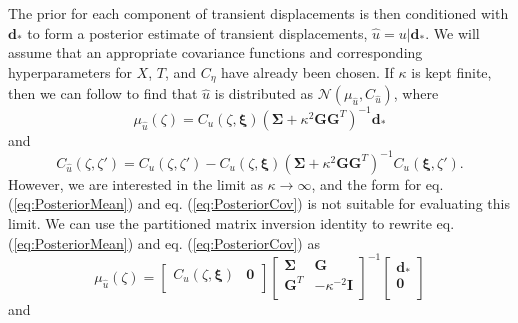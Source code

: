 \documentclass[10pt,letter]{article}
\begin{document}
The prior for each component of transient displacements is then conditioned with $\bm{d}_*$ to form a posterior estimate of transient displacements, $\hat{u} = u | \bm{d}_*$. We will assume that an appropriate covariance functions and corresponding hyperparameters for $X$, $T$, and $C_\eta$ have already been chosen. If $\kappa$ is kept finite, then we can follow \citet{Rasmussen2006} to find that $\hat{u}$ is distributed as $\mathcal{N}(\mu_{\hat{u}},C_{\hat{u}})$, where
\begin{equation}\label{eq:PosteriorMean}
\mu_{\hat{u}}(\zeta) = C_u(\zeta,\bm{\xi})\left(\bm{\Sigma} + \kappa^2\bm{G}\bm{G}^T\right)^{-1}\bm{d}_*
\end{equation}    
and
\begin{equation}\label{eq:PosteriorCov}
C_{\hat{u}}(\zeta,\zeta') = C_u(\zeta,\zeta') - C_u(\zeta,\bm{\xi})\left(\bm{\Sigma} + \kappa^2\bm{G}\bm{G}^T\right)^{-1}C_u(\bm{\xi},\zeta').
\end{equation}
However, we are interested in the limit as $\kappa \to \infty$, and the form for eq. (\ref{eq:PosteriorMean}) and eq. (\ref{eq:PosteriorCov}) is not suitable for evaluating this limit. We can use the partitioned matrix inversion identity \citep[e.g.,][]{Press2007} to rewrite eq. (\ref{eq:PosteriorMean}) and eq. (\ref{eq:PosteriorCov}) as
 \begin{equation}\label{eq:PosteriorMean2}
\mu_{\hat{u}}(\zeta) = \left[\begin{array}{cc}
                         C_u(\zeta,\bm{\xi}) & \bm{0} \\
                         \end{array}\right]
                   \left[\begin{array}{cc}
                         \bm{\Sigma} & \bm{G} \\
                         \bm{G}^T  & -\kappa^{-2} \bm{I} \\
                         \end{array}\right]^{-1}
                   \left[\begin{array}{c}
                         \bm{d}_* \\
                         \bm{0} \\
                         \end{array}\right]
\end{equation}    
and
\end{document}
